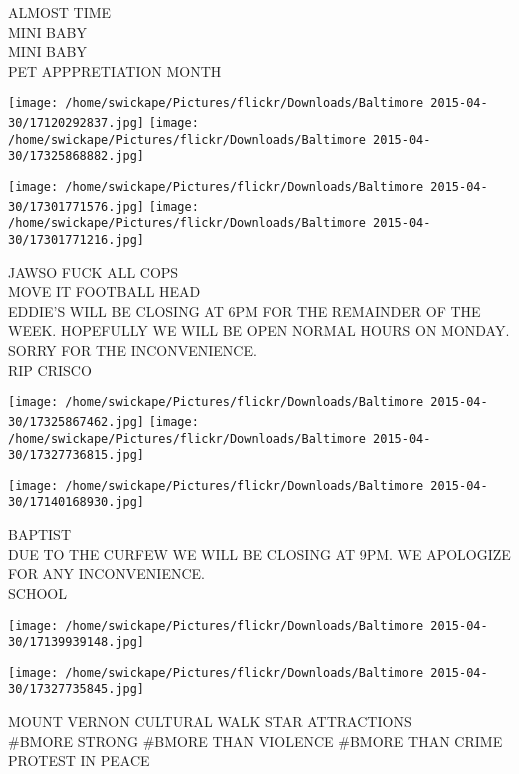 \documentclass[10pt,letterpaper]{article}
\begin{document}
ALMOST TIME\\
MINI BABY\\
MINI BABY\\
PET APPPRETIATION MONTH\\
\pagebreak

\texttt{[image: /home/swickape/Pictures/flickr/Downloads/Baltimore 2015-04-30/17120292837.jpg]}
\texttt{[image: /home/swickape/Pictures/flickr/Downloads/Baltimore 2015-04-30/17325868882.jpg]}

\texttt{[image: /home/swickape/Pictures/flickr/Downloads/Baltimore 2015-04-30/17301771576.jpg]}
\texttt{[image: /home/swickape/Pictures/flickr/Downloads/Baltimore 2015-04-30/17301771216.jpg]}

JAWSO FUCK ALL COPS\\
MOVE IT FOOTBALL HEAD\\
EDDIE'S WILL BE CLOSING AT 6PM FOR THE REMAINDER OF THE WEEK.  HOPEFULLY WE WILL BE OPEN NORMAL HOURS ON MONDAY.  SORRY FOR THE INCONVENIENCE.\\
RIP CRISCO\\
\pagebreak

\texttt{[image: /home/swickape/Pictures/flickr/Downloads/Baltimore 2015-04-30/17325867462.jpg]}
\texttt{[image: /home/swickape/Pictures/flickr/Downloads/Baltimore 2015-04-30/17327736815.jpg]}

\texttt{[image: /home/swickape/Pictures/flickr/Downloads/Baltimore 2015-04-30/17140168930.jpg]}

BAPTIST\\
DUE TO THE CURFEW WE WILL BE CLOSING AT 9PM.  WE APOLOGIZE FOR ANY INCONVENIENCE.\\
SCHOOL\\
\pagebreak

\texttt{[image: /home/swickape/Pictures/flickr/Downloads/Baltimore 2015-04-30/17139939148.jpg]}

\vspace{0.25in}
\texttt{[image: /home/swickape/Pictures/flickr/Downloads/Baltimore 2015-04-30/17327735845.jpg]}

MOUNT VERNON CULTURAL WALK STAR ATTRACTIONS\\
\#BMORE STRONG \#BMORE THAN VIOLENCE \#BMORE THAN CRIME PROTEST IN PEACE\\
\pagebreak
\end{document}
